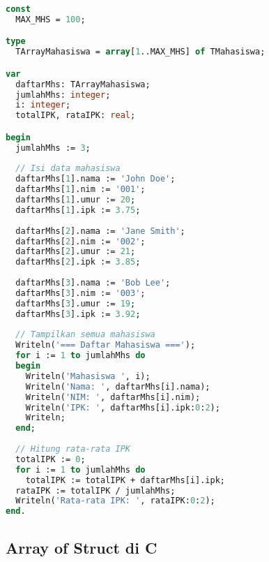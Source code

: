 \documentclass[../main.tex]{subfiles}
\begin{document}
\begin{lstlisting}[language=Pascal, caption={Array of struct di Pascal}]
const
  MAX_MHS = 100;

type
  TArrayMahasiswa = array[1..MAX_MHS] of TMahasiswa;

var
  daftarMhs: TArrayMahasiswa;
  jumlahMhs: integer;
  i: integer;
  totalIPK, rataIPK: real;

begin
  jumlahMhs := 3;
  
  // Isi data mahasiswa
  daftarMhs[1].nama := 'John Doe';
  daftarMhs[1].nim := '001';
  daftarMhs[1].umur := 20;
  daftarMhs[1].ipk := 3.75;
  
  daftarMhs[2].nama := 'Jane Smith';
  daftarMhs[2].nim := '002';
  daftarMhs[2].umur := 21;
  daftarMhs[2].ipk := 3.85;
  
  daftarMhs[3].nama := 'Bob Lee';
  daftarMhs[3].nim := '003';
  daftarMhs[3].umur := 19;
  daftarMhs[3].ipk := 3.92;
  
  // Tampilkan semua mahasiswa
  Writeln('=== Daftar Mahasiswa ===');
  for i := 1 to jumlahMhs do
  begin
    Writeln('Mahasiswa ', i);
    Writeln('Nama: ', daftarMhs[i].nama);
    Writeln('NIM: ', daftarMhs[i].nim);
    Writeln('IPK: ', daftarMhs[i].ipk:0:2);
    Writeln;
  end;
  
  // Hitung rata-rata IPK
  totalIPK := 0;
  for i := 1 to jumlahMhs do
    totalIPK := totalIPK + daftarMhs[i].ipk;
  rataIPK := totalIPK / jumlahMhs;
  Writeln('Rata-rata IPK: ', rataIPK:0:2);
end.
\end{lstlisting}

\subsection{Array of Struct di C}
\end{document}
